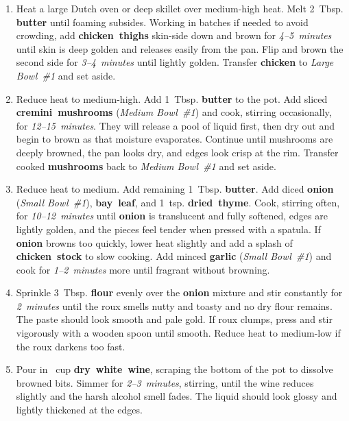 \documentclass[11pt,letterpaper]{article}
\begin{document}
\begin{enumerate}
    \item Heat a large Dutch oven or deep skillet over medium-high heat. Melt 2~Tbsp. \textbf{butter} until foaming subsides. Working in batches if needed to avoid crowding, add \textbf{chicken~thighs} skin-side down and brown for \textit{4--5~minutes} until skin is deep golden and releases easily from the pan. Flip and brown the second side for \textit{3--4~minutes} until lightly golden. Transfer \textbf{chicken} to \textit{Large Bowl~\#1} and set aside.

    \item Reduce heat to medium-high. Add 1~Tbsp. \textbf{butter} to the pot. Add sliced \textbf{cremini~mushrooms} (\textit{Medium Bowl~\#1}) and cook, stirring occasionally, for \textit{12--15~minutes}. They will release a pool of liquid first, then dry out and begin to brown as that moisture evaporates. Continue until mushrooms are deeply browned, the pan looks dry, and edges look crisp at the rim. Transfer cooked \textbf{mushrooms} back to \textit{Medium Bowl~\#1} and set aside.

    \item Reduce heat to medium. Add remaining 1~Tbsp. \textbf{butter}. Add diced \textbf{onion} (\textit{Small Bowl~\#1}), \textbf{bay~leaf}, and 1~tsp. \textbf{dried~thyme}. Cook, stirring often, for \textit{10--12~minutes} until \textbf{onion} is translucent and fully softened, edges are lightly golden, and the pieces feel tender when pressed with a spatula. If \textbf{onion} browns too quickly, lower heat slightly and add a splash of \textbf{chicken~stock} to slow cooking. Add minced \textbf{garlic} (\textit{Small Bowl~\#1}) and cook for \textit{1--2~minutes} more until fragrant without browning.

    \item Sprinkle 3~Tbsp. \textbf{flour} evenly over the \textbf{onion} mixture and stir constantly for \textit{2~minutes} until the roux smells nutty and toasty and no dry flour remains. The paste should look smooth and pale gold. If roux clumps, press and stir vigorously with a wooden spoon until smooth. Reduce heat to medium-low if the roux darkens too fast.

    \item Pour in ~cup \textbf{dry~white~wine}, scraping the bottom of the pot to dissolve browned bits. Simmer for \textit{2--3~minutes}, stirring, until the wine reduces slightly and the harsh alcohol smell fades. The liquid should look glossy and lightly thickened at the edges.


\end{enumerate}
\end{document}
